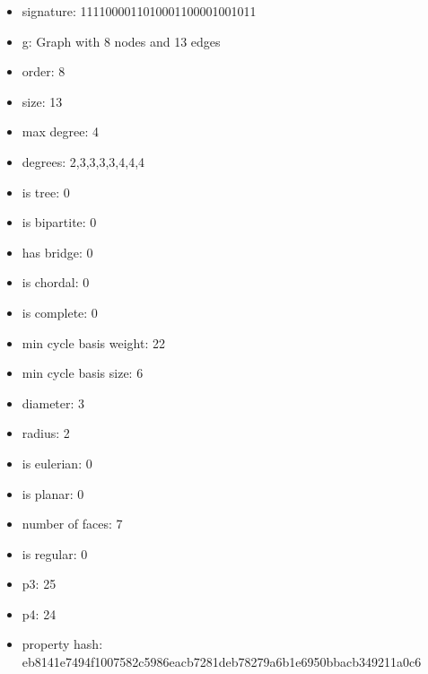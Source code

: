 \begin{itemize}
\item signature: 1111000011010001100001001011
\item g: Graph with 8 nodes and 13 edges
\item order: 8
\item size: 13
\item max degree: 4
\item degrees: 2,3,3,3,3,4,4,4
\item is tree: 0
\item is bipartite: 0
\item has bridge: 0
\item is chordal: 0
\item is complete: 0
\item min cycle basis weight: 22
\item min cycle basis size: 6
\item diameter: 3
\item radius: 2
\item is eulerian: 0
\item is planar: 0
\item number of faces: 7
\item is regular: 0
\item p3: 25
\item p4: 24
\item property hash: eb8141e7494f1007582c5986eacb7281deb78279a6b1e6950bbacb349211a0c6
\end{itemize}
\newpage
\begin{figure}
\end{figure}
